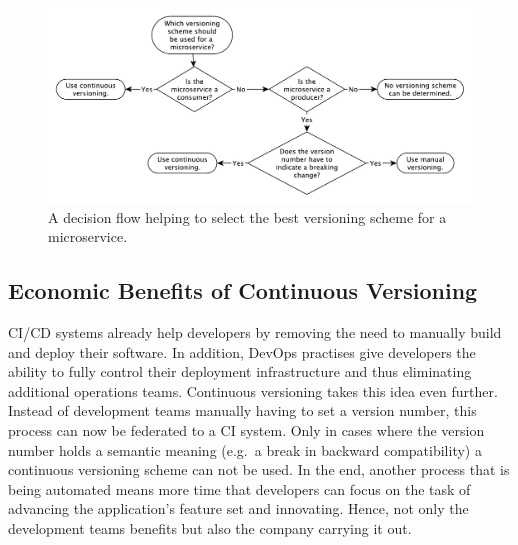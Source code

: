 \begin{figure}[H]
\begin{center}
  \includegraphics[scale=0.55]{images/figures/versioning_decision_flow.pdf}
\end{center}
\caption{A decision flow helping to select the best versioning scheme for a
microservice.}%
\label{fig:versioning_decision_flow}
\end{figure}


\subsection{Economic Benefits of Continuous Versioning}%
\label{sub:Economic_Benefits_of_Continuous_Versioning}
\ac{CI}/\ac{CD} systems already help developers by removing the need to
manually build and deploy their software. In addition, DevOps practises give
developers the ability to fully control their deployment infrastructure and
thus eliminating additional operations teams. Continuous versioning takes this
idea even further. Instead of development teams manually having to set a
version number, this process can now be federated to a \ac{CI} system. Only in
cases where the version number holds a semantic meaning (e.g.\ a break in
backward compatibility) a continuous versioning scheme can not be used. In the
end, another process that is being automated means more time that developers can
focus on the task of advancing the application's feature set and innovating.
Hence, not only the development teams benefits but also the company carrying it
out.
